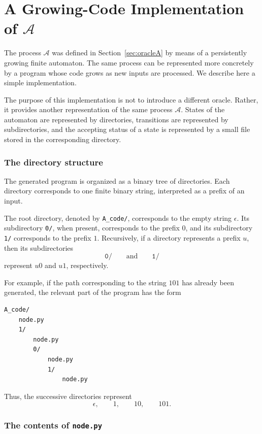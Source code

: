 \documentclass[11pt]{article}
\begin{document}
\appendix
\section{A Growing-Code Implementation of \texorpdfstring{\(\mathcal A\)}{A}}
\label{app:growing-code}

The process \(\mathcal A\) was defined in Section~\ref{sec:oracleA} by means of a
persistently growing finite automaton.  The same process can be represented
more concretely by a program whose code grows as new inputs are processed.
We describe here a simple  implementation.

The purpose of this implementation is not to introduce a different oracle.
Rather, it provides another representation of the same process
\(\mathcal A\).  States of the automaton are represented by directories,
transitions are represented by subdirectories, and the accepting status of
a state is represented by a small file stored in the corresponding
directory.

\subsubsection*{The directory structure}

The generated program is organized as a binary tree of directories.  Each
directory corresponds to one finite binary string, interpreted as a prefix
of an input.

The root directory, denoted by
\texttt{A\_code/}, corresponds to the empty string \(\epsilon\).  Its
subdirectory \texttt{0/}, when present, corresponds to the prefix \(0\),
and its subdirectory \texttt{1/} corresponds to the prefix \(1\).
Recursively, if a directory represents a prefix \(u\), then its
subdirectories
\[
\texttt{0/}
\qquad\text{and}\qquad
\texttt{1/}
\]
represent \(u0\) and \(u1\), respectively.

For example, if the path corresponding to the string \(101\) has already
been generated, the relevant part of the program has the form
\begin{verbatim}
A_code/
    node.py
    1/
        node.py
        0/
            node.py
            1/
                node.py
\end{verbatim}

Thus, the successive directories represent
\[
\epsilon,\qquad
1,\qquad
10,\qquad
101.
\]

\subsubsection*{The contents of \texttt{node.py}}
\end{document}
